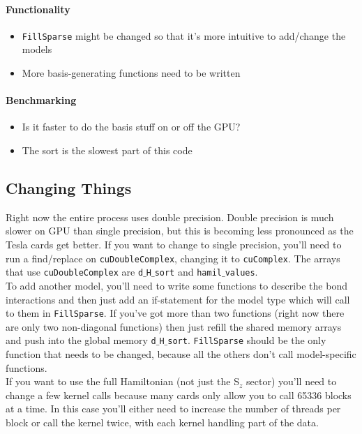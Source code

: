 \documentclass{article}
\begin{document}
\paragraph{Functionality}
\begin{itemize}
\item{\texttt{FillSparse} might be changed so that it's more intuitive to add/change the models}
\item{More basis-generating functions need to be written}
\end{itemize}
\paragraph{Benchmarking}
\begin{itemize}
\item{Is it faster to do the basis stuff on or off the GPU?}
\item{The sort is the slowest part of this code}
\end{itemize}

\subsection{Changing Things}
Right now the entire process uses double precision. 
Double precision is much slower on GPU than single precision, but this is becoming less pronounced as the Tesla cards get better. 
If you want to change to single precision, you'll need to run a find/replace on \texttt{cuDoubleComplex}, changing it to \texttt{cuComplex}. 
The arrays that use \texttt{cuDoubleComplex} are \texttt{d$\_$H$\_$sort} and \texttt{hamil$\_$values}.\\ 
To add another model, you'll need to write some functions to describe the bond interactions and then just add an if-statement for the model type which will call to them in \texttt{FillSparse}. 
If you've got more than two functions (right now there are only two non-diagonal functions) then just refill the shared memory arrays and push into the global memory \texttt{d$\_$H$\_$sort}. 
\texttt{FillSparse} should be the only function that needs to be changed, because all the others don't call model-specific functions.\\
If you want to use the full Hamiltonian (not just the S$_z$ sector) you'll need to change a few kernel calls because many cards only allow you to call 65336 blocks at a time. 
In this case you'll either need to increase the number of threads per block or call the kernel twice, with each kernel handling part of the data. 
 
\end{document}
